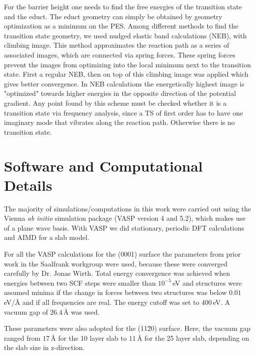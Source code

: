 \documentclass[11pt,DIV=13,BCOR=5mm,a4paper,headinclude]{scrbook}
\begin{document}
For the barrier height one needs to find the free energies of the transition state and the educt.
The educt geometry can simply be obtained by geometry optimization as a minimum on the PES.
Among different methods to find the transition state geometry, we used nudged elastic band calculations (NEB)\cite{Henkelman00a}, with climbing image\cite{Henkelman00b}.
This method approximates the reaction path as a series of associated images, which are connected via spring forces.
These spring forces prevent the images from optimizing into the local minimum next to the transition state.
First a regular NEB, then on top of this climbing image was applied which gives better convergence.
In NEB calculations the energetically highest image is "optimized" towards higher energies in the opposite direction of the potential gradient.
Any point found by this scheme must be checked whether it is a transition state via frequency analysis, since a TS of first order has to have one imaginary mode that vibrates along the reaction path.
Otherwise there is no transition state.

\section{Software and Computational Details}
The majority of simulations/computations in this work were carried out using the Vienna \textit{ab initio} simulation package (VASP version 4 and 5.2)\cite{kresse1993,kresse2,kresse3,kresse4,kresse99}, which makes use of a plane wave basis.
With VASP we did stationary, periodic DFT calculations and AIMD for a slab model.


For all the VASP calculations for the (0001) surface the parameters from prior work in the Saalfrank workgroup were used, because these were converged carefully by Dr. Jonas Wirth\cite{WirthJPCC2012,Wirth2014,Wirth2015,Wirth2016}.
Total energy convergence was achieved when energies between two SCF steps were smaller than $10^{-5}\,$eV and structures were assumed minima if the change in forces between two structures was below $0.01\,$eV/\AA{} and if all frequencies are real.
The energy cutoff was set to $400\,$eV.
A vacuum gap of $26.4\,$\AA{} was used.


These parameters were also adopted for the (11\=20) surface.
Here, the vacuum gap ranged from $17\,$\AA{} for the 10 layer slab to $11\,$\AA{} for the 25 layer slab, depending on the slab size in z-direction.
\\\\
\end{document}
